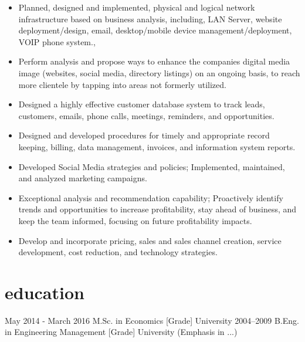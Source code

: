\documentclass[]{cv-style}          %
\begin{document}
\begin{entrylist}
{\begin{itemize}
\item Planned, designed and implemented, physical and logical network infrastructure based on business analysis, including, LAN Server, website deployment/design, email, desktop/mobile device management/deployment, VOIP phone system.,
\item Perform analysis and propose ways to enhance the companies digital media image (websites, social media, directory listings) on an ongoing basis, to reach more clientele by tapping into areas not formerly utilized.
\item Designed a highly effective customer database system to track leads, customers, emails, phone calls, meetings, reminders, and opportunities.
\item Designed and developed procedures for timely and appropriate record keeping, billing, data management, invoices, and information system reports.
\item Developed Social Media strategies and policies; Implemented, maintained, and analyzed marketing campaigns.
\item Exceptional analysis and recommendation capability; Proactively identify trends and opportunities to increase profitability, stay ahead of business, and keep the team informed, focusing on future profitability impacts.
\item Develop and incorporate pricing, sales and sales channel creation, service development, cost reduction, and technology strategies.
\end{itemize}}

\end{entrylist}



\section{education}

\begin{entrylist}
\patchcmd\entry
{May 2014 - March 2016}
{M.Sc. {\normalfont in Economics [Grade]}}
{University}
{\vspace{-0.3cm}}
\entry
{2004--2009}
{B.Eng. {\normalfont in Engineering Management [Grade]}}
{University}
{(Emphasis in ...)}
\end{entrylist}
\end{document}
